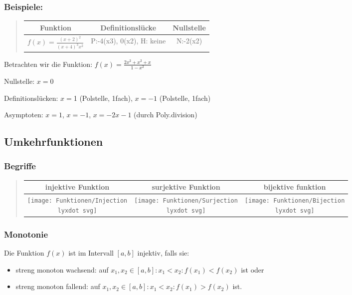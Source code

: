 \subsubsection*{Beispiele:}
\begin{verse}
\begin{tabular}{|c|c|c|}
\hline 
Funktion & Definitionslücke & Nullstelle\tabularnewline
\hline 
\hline 
$f(x)=\frac{(x+2)^{2}}{(x+4)^{3}x^{2}}$ & P:-4(x3), 0(x2), H: keine & N:-2(x2)\tabularnewline
\hline 
\end{tabular}
\end{verse}


Betrachten wir die Funktion: $f(x)=\frac{2x^{2}+x^{2}+x}{1-x^{2}}$

Nullstelle: $x=0$

Definitionslücken: $x=$1 (Polstelle, 1fach), $x=-1$ (Polstelle,
1fach)

Asymptoten: $x=1$, $x=-1$, $x=-2x-1$ (durch Poly.division)


\subsection*{Umkehrfunktionen}


\subsubsection*{Begriffe}
\begin{verse}
\begin{tabular}{|c|c|c|}
\hline 
injektive Funktion & surjektive Funktion & bijektive funktion\tabularnewline
\hline 
\hline 
\texttt{[image: Funktionen/Injection\\lyxdot svg]} & \texttt{[image: Funktionen/Surjection\\lyxdot svg]} & \texttt{[image: Funktionen/Bijection\\lyxdot svg]}\tabularnewline
\hline 
\end{tabular}
\end{verse}

\subsubsection*{Monotonie}

Die Funktion $f(x)$ ist im Intervall $[a,b]$ injektiv, falls sie:
\begin{itemize}
\item streng monoton wachsend: auf $x_{1},x_{2}\in[a,b]:x_{1}<x_{2}:f(x_{1})<f(x_{2})$
ist oder
\item streng monoton fallend: auf $x_{1},x_{2}\in[a,b]:x_{1}<x_{2}:f(x_{1})>f(x_{2})$
ist.
\end{itemize}


